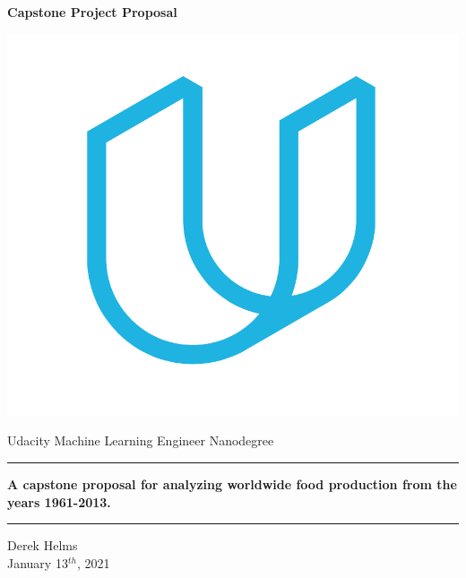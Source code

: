 \documentclass[12pt, a4paper]{article}
\begin{document}
\begin{spacing}{1.1}

	\begin{titlepage}
	\begin{center}
		\vspace*{1.4cm}
		
		\Huge \textbf{Capstone Project Proposal}
		
		\vspace*{1cm}
		
		\includegraphics[scale=.5]{logo}
		
		\vspace*{1cm}
		
		\LARGE {Udacity Machine Learning Engineer Nanodegree}
		
		\vspace*{1cm}
		
		\hrule \vspace*{.5cm}
		
		\Large \textbf{A capstone proposal for analyzing worldwide food production from the years 1961-2013.}
		
		\vspace*{.5cm} \hrule
		
		\vspace*{1cm}
		
		\Large Derek Helms \\
		\Large January 13$^{th}$, 2021
	\end{center}
	\end{titlepage} \newpage


\end{spacing}
\end{document}
